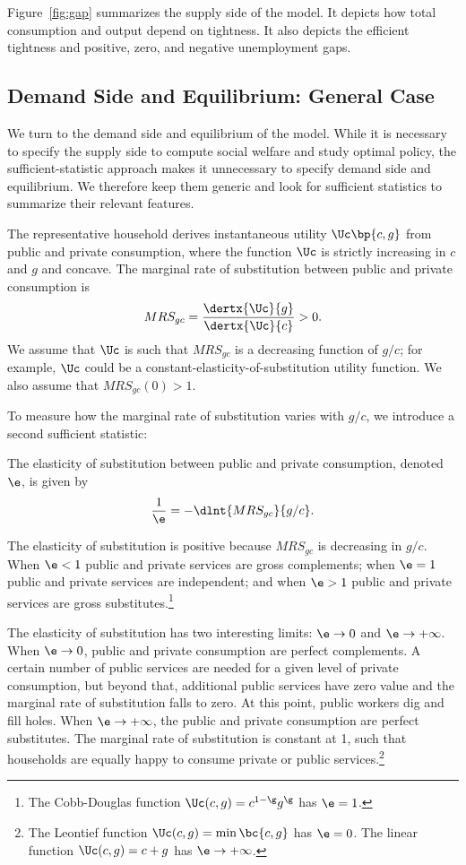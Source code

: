 \documentclass[letterpaper,12pt,leqno]{article}
\begin{document}
\begin{bibunit}
Figure~\ref{fig:gap} summarizes the supply side of the model. It depicts how total consumption and output depend on tightness. It also depicts the efficient tightness and positive, zero, and negative unemployment gaps.

\subsection{Demand Side and Equilibrium: General Case}\label{sec:demand}

We turn to the demand side and equilibrium of the model. While it is necessary to specify the supply side to compute social welfare and study optimal policy, the sufficient-statistic approach makes it unnecessary to specify demand side and equilibrium. We therefore keep them generic and look for sufficient statistics to summarize their relevant features.

The representative household derives instantaneous utility $\Uc\bp{c,g}$ from public and private consumption, where the function $\Uc$ is strictly increasing in $c$ and $g$ and concave. The marginal rate of substitution between public and private consumption is
\begin{equation*}
MRS_{gc} = \frac{\dertx{\Uc}{g}}{\dertx{\Uc}{c}}>0.
\end{equation*}
We assume that $\Uc$ is such that $MRS_{gc}$ is a decreasing function of $g/c$; for example, $\Uc$ could be a constant-elasticity-of-substitution utility function. We also assume that $MRS_{gc}(0)> 1$.

To measure how the marginal rate of substitution varies with $g/c$, we introduce a second sufficient statistic:
\begin{defn} The elasticity of substitution between public and private consumption, denoted $\e$, is given by
\begin{equation*}
\frac{1}{\e} = -\dlnt{MRS_{gc}}{g/c}.
\end{equation*}\end{defn}
The elasticity of substitution is positive because $MRS_{gc}$ is decreasing in $g/c$. When $\e<1$ public and private services are gross complements; when $\e=1$ public and private services are independent; and when $\e>1$ public and private services are gross substitutes.\footnote{The Cobb-Douglas function $\Uc(c,g)=c^{1-\g}  g^{\g}$ has $\e=1$.}

The elasticity of substitution has two interesting limits: $\e\to 0$ and $\e\to+\infty$. When $\e\to 0$, public and private consumption are perfect complements. A certain number of public services are needed for a given level of private consumption, but beyond that, additional public services have zero value and the marginal rate of substitution falls to zero. At this point, public workers dig and fill holes. When $\e\to+\infty$, the public and private consumption are perfect substitutes. The marginal rate of substitution is constant at 1, such that households are equally happy to consume private or public services.\footnote{The Leontief function $\Uc(c,g)=\min\bc{c, g}$ has $\e=0$. The linear function $\Uc(c,g)=c+g$ has $\e\to+\infty$.}


\end{bibunit}
\end{document}
